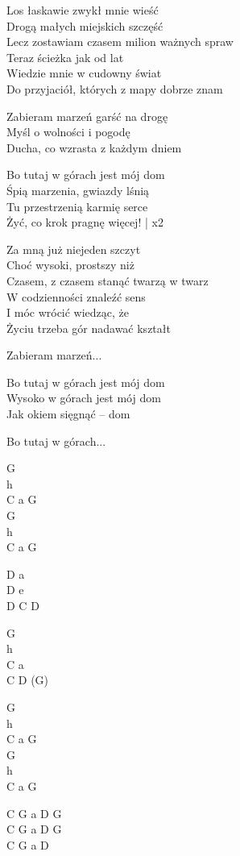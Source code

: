 \begin{textn}
    Los łaskawie zwykł mnie wieść\\
    Drogą małych miejskich szczęść\\
    Lecz zostawiam czasem milion ważnych spraw\\
    Teraz ścieżka jak od lat\\
    Wiedzie mnie w cudowny świat\\
    Do przyjaciół, których z mapy dobrze znam

    \vin Zabieram marzeń garść na drogę\\
    \vin Myśl o wolności i pogodę\\
    \vin Ducha, co wzrasta z każdym dniem

    \vin Bo tutaj w górach jest mój dom\\
    \vin Śpią marzenia, gwiazdy lśnią\\
    \vin Tu przestrzenią karmię serce\\
    \vin Żyć, co krok pragnę więcej! | x2

    Za mną już niejeden szczyt\\
    Choć wysoki, prostszy niż\\
    Czasem, z czasem stanąć twarzą w twarz\\
    W codzienności znaleźć sens\\
    I móc wrócić wiedząc, że\\
    Życiu trzeba gór nadawać kształt

    \vin Zabieram marzeń...

    \vin Bo tutaj w górach jest mój dom\\
    \vin Wysoko w górach jest mój dom\\
    \vin Jak okiem sięgnąć – dom
    
    \vin Bo tutaj w górach...
\end{textn}
\begin{chordw}
    G\\
    h\\
    C a G\\
    G\\
    h\\
    C a G

    D a\\
    D e\\
    D C D

    G\\
    h\\
    C a\\
    C D (G)
    
    G\\
    h\\
    C a G\\
    G\\
    h\\
    C a G
    
    \hfill\break
    \hfill\break
    C G a D G\\
    C G a D G\\
    C G a D
\end{chordw}
